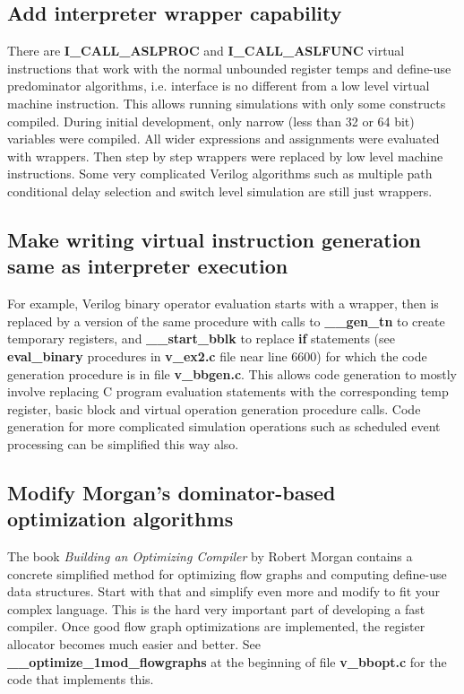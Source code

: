 \documentclass[preprint, authoryear]{sigplanconf}
\begin{document}
\subsection{Add interpreter wrapper capability}
\par
There are \textbf{I_CALL_ASLPROC} and \textbf{I_CALL_ASLFUNC}
virtual instructions that work with the normal unbounded register temps and
define-use predominator algorithms, i.e. interface is no different from a
low level virtual machine instruction.
This allows running simulations with only some constructs compiled.
During initial development, only narrow (less than 32 or 64 bit)
variables were compiled.  All wider expressions and assignments were
evaluated with wrappers.  Then step by step wrappers were
replaced by low level machine instructions.
Some very complicated Verilog algorithms such as multiple path
conditional delay selection and switch level simulation are still
just wrappers.
\subsection{Make writing virtual instruction generation same as interpreter execution}
\par
For example, Verilog binary operator evaluation starts with a wrapper,
then is replaced by a version of the same procedure with calls to 
\textbf{__gen_tn} to create temporary registers, and \textbf{__start_bblk} to
replace \textbf{if} statements (see \textbf{eval_binary}
procedures in \textbf{v_ex2.c} file near line 6600) for which
the code generation procedure is in file \textbf{v_bbgen.c}.
This allows code generation to mostly involve replacing C program
evaluation statements with the corresponding 
temp register, basic block  and virtual operation
generation procedure calls.
Code generation for more complicated simulation operations such as
scheduled event processing can be simplified this way also.
\subsection{Modify Morgan's dominator-based optimization algorithms}
\par
The book \textit{Building an Optimizing Compiler} by Robert Morgan
contains a concrete simplified method for optimizing flow graphs
and computing define-use data structures.  Start with that and simplify
even more and modify to fit your complex language.
This is the hard very important part of developing a fast compiler.
Once good flow graph optimizations are implemented, the register allocator
becomes much easier and better.
See \textbf{__optimize_1mod_flowgraphs} at the beginning of file
\textbf{v_bbopt.c} for the code that implements this.
\end{document}
